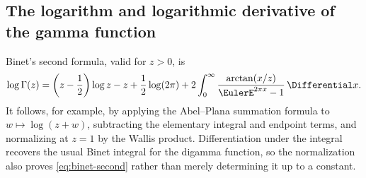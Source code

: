 \documentclass[11pt,a4paper,oneside,openany]{book}
\theoremstyle{definition}
\theoremstyle{remark}
\begin{document}
\subsection{The logarithm and logarithmic derivative of the gamma function}
Binet's second formula, valid for $z>0$, is
\begin{equation}
\label{eq:binet-second}
 \log\Gamma(z)
 =\left(z-\frac12\right)\log z-z+\frac12\log(2\pi)
 +2\int_0^\infty\frac{\arctan(x/z)}{\EulerE^{2\pi x}-1}\,\Differential x.
\end{equation}
It follows, for example, by applying the Abel--Plana summation formula to
$w\mapsto\log(z+w)$, subtracting the elementary integral and endpoint terms, and
normalizing at $z=1$ by the Wallis product.  Differentiation under the integral
recovers the usual Binet integral for the digamma function, so the normalization
also proves \eqref{eq:binet-second} rather than merely determining it up to a
constant.
\end{document}
